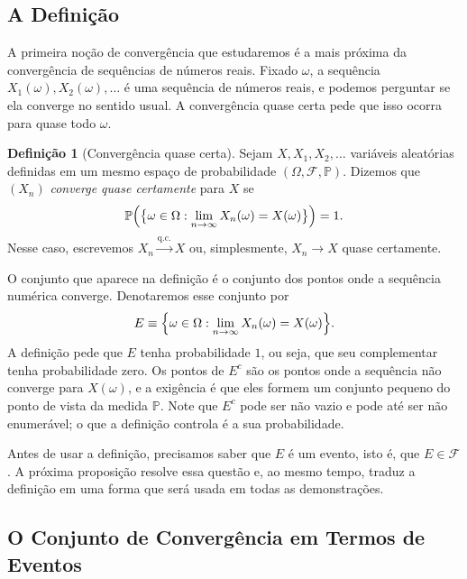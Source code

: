 \documentclass[12pt,portuguese]{article}
\theoremstyle{definition}
\newtheorem{definition}[definition]{Definição}
\theoremstyle{plainexercise}
\theoremstyle{starredexercise}
\theoremstyle{definition}
\begin{document}
\subsection{A Definição}\label{subsec:qc-definicao}

A primeira noção de convergência que estudaremos é a mais próxima da
convergência de sequências de números reais. Fixado $\omega$, a sequência
$X_1(\omega),X_2(\omega),\ldots$ é uma sequência de números reais, e podemos
perguntar se ela converge no sentido usual. A convergência quase certa pede que
isso ocorra para quase todo $\omega$.

\begin{definition}[Convergência quase certa]\label{def:qc}
Sejam $X,X_1,X_2,\ldots$ variáveis aleatórias definidas em um mesmo espaço de
probabilidade $(\Omega,\mathcal{F},\mathbb{P})$. Dizemos que $(X_n)$
\emph{converge quase certamente} para $X$ se
\[
\mathbb{P}\Bigl(\bigl\{\omega\in\Omega:
\lim_{n\to\infty}X_n(\omega)=X(\omega)\bigr\}\Bigr)=1.
\]
Nesse caso, escrevemos $X_n\xrightarrow{\text{q.c.}}X$ ou, simplesmente,
$X_n\to X$ quase certamente.
\end{definition}

O conjunto que aparece na definição é o conjunto dos pontos onde a sequência
numérica converge. Denotaremos esse conjunto por
\[
E\equiv\Bigl\{\omega\in\Omega:\lim_{n\to\infty}X_n(\omega)=X(\omega)\Bigr\}.
\]
A definição pede que $E$ tenha probabilidade $1$, ou seja, que seu complementar
tenha probabilidade zero. Os pontos de $E^c$ são os pontos onde a sequência não
converge para $X(\omega)$, e a exigência é que eles formem um conjunto pequeno do ponto de vista
da medida $\mathbb{P}$. Note que $E^c$ pode ser não vazio e pode até ser não
enumerável; o que a definição controla é a sua probabilidade.

Antes de usar a definição, precisamos saber que $E$ é um evento, isto é, que
$E\in\mathcal{F}$. A próxima proposição resolve essa questão e, ao mesmo tempo,
traduz a definição em uma forma que será usada em todas as demonstrações.

\subsection{O Conjunto de Convergência em Termos de Eventos}\label{subsec:qc-conjunto}
\end{document}
